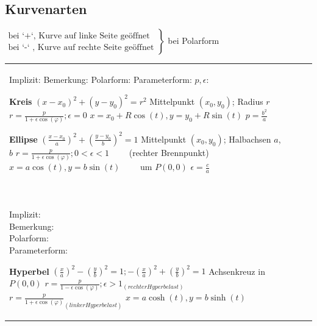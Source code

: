 \subsection{Kurvenarten}
$ \left.\begin{matrix}
	\text{bei `+`, Kurve auf linke Seite geöffnet}\\ 
	\text{bei `-` , Kurve auf rechte Seite geöffnet}
\end{matrix}\right\rbrace $ 
bei Polarform

\begin{tabular}{llll}
\parbox{2.7cm}{
\textbf{ } \\
Implizit:\\
Bemerkung:\\
Polarform:\\
Parameterform:\\
$p, \epsilon$:
}

\parbox{6cm}{
\textbf{Kreis}\\
$(x-x_0)^2 + (y - y_0)^2 = r^2$\\
Mittelpunkt $(x_0, y_0)$; Radius $r$\\
$r = \frac{p}{1 + \epsilon \cos(\varphi)}; \epsilon = 0$\\
$x=x_0 + R\cos(t), y=y_0 + R\sin(t) $ \\
$ p = \frac{b^2}{a}$
} 

\parbox{8cm}{
\textbf{Ellipse}\\
$(\frac{x-x_0}{a})^2 + (\frac{y-y_0}{b})^2 = 1$\\
Mittelpunkt $(x_0, y_0)$; Halbachsen $a$, $b$\\
$r = \frac{p}{1 + \epsilon \cos(\varphi)}; 0 < \epsilon < 1 \qquad$ (rechter Brennpunkt)\\
$x = a\cos(t), y = b\sin(t) \qquad$ um $P(0,0)$ \\
$\epsilon = \frac{c}{a}$
}\\ \\


\parbox{2.7cm}{
\textbf {}\\
Implizit:\\
Bemerkung:\\
Polarform:\\
Parameterform:
}

\parbox{6cm}{
\textbf{Hyperbel}\\ 
$(\frac{x}{a})^2 - (\frac{y}{b})^2 = 1; -(\frac{x}{a})^2 + (\frac{y}{b})^2 =1$\\ 
Achsenkreuz in $P(0,0)$\\
$r = \frac{p}{1 - \epsilon \cos(\varphi)}; \epsilon > 1_{(rechter Hyperbelast)}$\\
$r = \frac{p}{1 + \epsilon \cos(\varphi)}_{(linker Hyperbelast)}$ \\
$x= a \cosh(t), y = b \sinh(t) $ 

}
\end{tabular}

